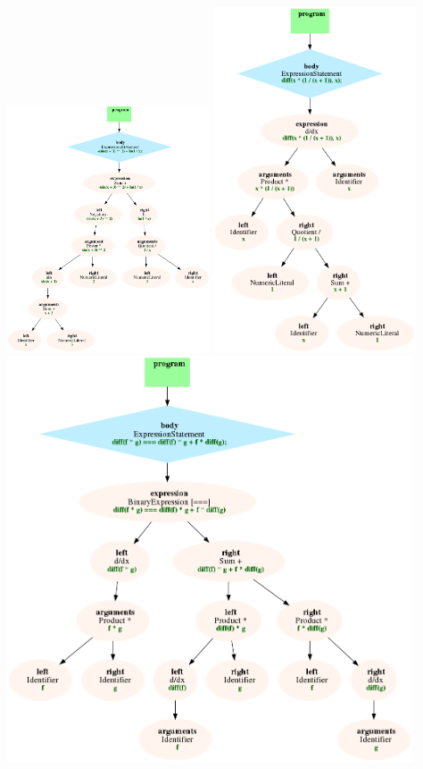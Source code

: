 \includegraphics[width=0.45\textwidth]{../tex-snippets/ex-syntax-tree-1-img-c.png}
\includegraphics[width=0.45\textwidth]{../tex-snippets/ex-syntax-tree-1-img-d.png}
\\

\includegraphics[width=0.90\textwidth]{../tex-snippets/ex-syntax-tree-1-img-e.png}
\\

